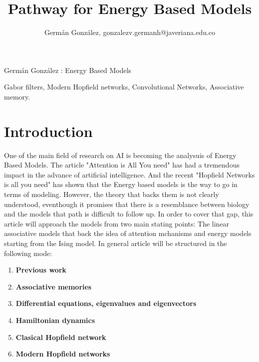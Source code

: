 \documentclass[journal]{IEEEtai}
\begin{document}
\title{Pathway for Energy Based Models} 


\author{Germán González, gonzalezv.germanh@javeriana.edu.co }


{Germán González : Energy Based Models}

\maketitle
\captionsetup{font=footnotesize,justification=justified}
\begin{abstract}

\end{abstract}
  
 

\begin{IEEEkeywords}
Gabor filters, Modern Hopfield networks, Convolutional Networks, Associative memory.
\end{IEEEkeywords}


\section{Introduction}
One of the main field of research on AI is becoming the analysuis of Energy Based Models. The article "Attention is All You need" has had a tremendous impact in the advance of artificial intelligence. And  the recent "Hopfield Networks is all you need" has shown that the Energy based models is the way to go in terms of modeling. However, the theory that backs them is not clearly understood, eventhough it promises that there is a resemblance between biology and the models that path is difficult to follow up. In order to cover that gap, this article will approach the models from two main stating points: The linear associative models that back the idea of attention mchanisms and energy models starting from the Ising model. In general article will be structured in the following mode:

\begin{enumerate}
  \item \textbf{Previous work}
  \item \textbf{Associative memories}
  \item \textbf{Differential equations, eigenvalues and eigenvectors}
  \item \textbf{Hamiltonian dynamics}
  \item \textbf{Clasical Hopfield network}
  \item \textbf{Modern Hopfield networks}
  
\end{enumerate}
\end{document}
